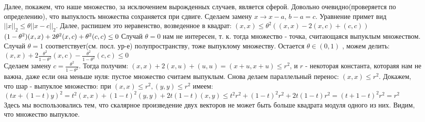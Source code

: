 \documentclass{article}
\begin{document}
\begin{itemize}
 Далее, покажем, что наше множество, за исключением вырожденных случаев, является сферой. Довольно очевидно(проверяется по определению), что выпуклость множества сохраняется при сдвиге. Сделаем замену  $x \rightarrow x - a$, $b - a = c$. Уравнение примет вид $||x||_2 \leq \theta||x - c||_2$. Далее, распишем это неравенство, возведенное в квадрат:
  $(x, x) \leq \theta^2((x, x) - 2(x, c) + (c, c))$ \\
  $(1 - \theta^2)(x, x) + 2\theta^2(x, c) + \theta^2(c, c) \leq 0\\$
Случай $\theta = 0$ нам не интересен, т. к. тогда множество - точка, считающаяся выпуклым множеством. Случай $\theta = 1$ соответствует(см. посл. ур-е) полупространству, тоже выпуклому множеству. Остается $\theta \in (0, 1)$ , можем делить:  \\
$\displaystyle (x, x) + 2\frac{\theta^2}{1 - \theta^2}(x, c) - \frac{\theta^2}{1 - \theta^2}(c, c) \leq 0$\\
Сделаем замену $\displaystyle c = \frac{\theta^2}{1 - \theta^2}$. Тогда получим: $(x, x) + 2(x, u) + (u, u) = (x + u, x + u) \leq r^2$, и $r$ - некоторая константа, котораяя нам не важна, даже если она меньше нуля: пустое множество считаем выпуклым. Снова делаем параллельный перенос: $(x, x) \leq r^2$. Докажем, что шар - выпуклое множество: при $(x, x) \leq r^2, (y, y) \leq r^2$ имеем:\\
$(tx + (1 - t)y)^2 = t^2(x, x)+ (1 - t)^2(y, y) + 2t(1 - t)(x, y) \leq
t^2r^2+ (1 - t)^2r^2 + 2t(1 - t)r^2 = (t + 1 - t)^2r^2 = r^2$\\
Здесь мы воспользовались тем, что скалярное произведение двух векторов не может быть больше квадрата модуля одного из них. Видим, что множество выпуклое.
\end{itemize}   
\end{document}
